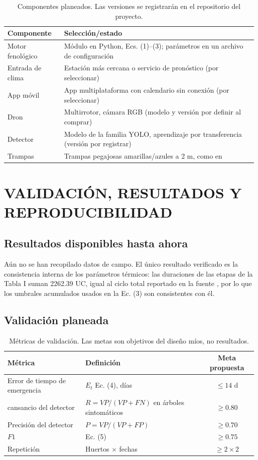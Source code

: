 \documentclass[conference]{IEEEtran}
\begin{document}
\begin{table}[htbp]
\centering
\caption{Componentes planeados. Las versiones se registrarán en el repositorio del proyecto.}
\label{tab:componentes}
\begin{tabular}{p{2.3cm}p{5.5cm}}
\toprule
\textbf{Componente} & \textbf{Selección/estado} \\
\midrule
Motor fenológico & Módulo en Python, Ecs. (1)--(3); parámetros en un archivo de configuración \\
Entrada de clima & Estación más cercana o servicio de pronóstico (por seleccionar) \\
App móvil & App multiplataforma con calendario sin conexión (por seleccionar) \\
Dron & Multirrotor, cámara RGB (modelo y versión por definir al comprar) \\
Detector & Modelo de la familia YOLO, aprendizaje por transferencia (versión por registrar) \\
Trampas & Trampas pegajosas amarillas/azules a 2 m, como en \cite{ref11} \\
\bottomrule
\end{tabular}
\end{table}

\section{VALIDACIÓN, RESULTADOS Y REPRODUCIBILIDAD}

\subsection{Resultados disponibles hasta ahora}
Aún no se han recopilado datos de campo. El único resultado verificado es la consistencia interna de los parámetros térmicos: las duraciones de las etapas de la Tabla I suman 2262.39 UC, igual al ciclo total reportado en la fuente \cite{ref1}, por lo que los umbrales acumulados usados en la Ec. (3) son consistentes con él. 
\subsection{Validación planeada}

\begin{table}[htbp]
\centering
\caption{Métricas de validación. Las metas son objetivos del diseño míos, no resultados.}
\label{tab:metricas}
\begin{tabular}{p{2.5cm}p{3.4cm}c}
\toprule
\textbf{Métrica} & \textbf{Definición} & \textbf{Meta propuesta} \\
\midrule
Error de tiempo de emergencia & $E_{t}$ Ec. (4), días & $\le 14\text{ d}$ \\
cansancio del detector & $R=VP/(VP+FN)$ en árboles sintomáticos & $\ge 0.80$ \\
Precisión del detector & $P=VP/(VP+FP)$ & $\ge 0.70$ \\
$F1$ & Ec. (5) & $\ge 0.75$ \\
Repetición & Huertos $\times$ fechas & $\ge 2 \times 2$ \\
\bottomrule
\end{tabular}
\end{table}
\end{document}
